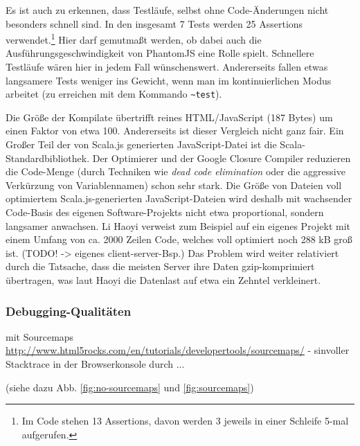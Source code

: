 \documentclass[a4paper, 12pt, hidelinks, listof=totoc, listoftables=totoc, bibliography=totoc]{scrreprt}
\begin{document}
Es ist auch zu erkennen, dass Testläufe, selbst ohne Code-Änderungen nicht besonders schnell sind. In den insgesamt 7 Tests werden 25 Assertions verwendet.\footnote{
	Im Code stehen 13 Assertions, davon werden 3 jeweils in einer Schleife 5-mal aufgerufen.}
Hier darf gemutmaßt werden, ob dabei auch die Ausführungsgeschwindigkeit von PhantomJS eine Rolle spielt. Schnellere Testläufe wären hier in jedem Fall wünschenswert. Andererseits fallen etwas langsamere Tests weniger ins Gewicht, wenn man 
im kontinuierlichen Modus arbeitet (zu erreichen mit dem Kommando \texttt{\textasciitilde{}test}).

Die Größe der Kompilate übertrifft reines HTML/JavaScript (187 Bytes) um einen Faktor von etwa 100. Andererseits ist dieser Vergleich nicht ganz fair. Ein Großer Teil der von Scala.js generierten JavaScript-Datei ist die Scala-Standardbibliothek.
Der Optimierer und der Google Closure Compiler reduzieren die Code-Menge (durch Techniken wie \textit{dead code elimination} oder die aggressive Verkürzung von Variablennamen) schon sehr stark. Die Größe von Dateien voll optimiertem Scala.js-generierten JavaScript-Dateien wird deshalb mit wachsender Code-Basis des eigenen Software-Projekts nicht etwa proportional, sondern langsamer anwachsen. Li Haoyi verweist zum Beispiel auf ein eigenes Projekt mit einem Umfang von ca. 2000 Zeilen Code, welches voll optimiert noch 288 kB groß ist. (TODO! -> eigenes client-server-Bsp.) Das Problem wird weiter relativiert durch die Tatsache, dass die meisten Server ihre Daten gzip-komprimiert übertragen, was laut Haoyi die Datenlast auf etwa ein Zehntel verkleinert.\cite[\#BlobSize]{haoyi.HOS}

\subsubsection{Debugging-Qualitäten}

mit Sourcemaps
\url{http://www.html5rocks.com/en/tutorials/developertools/sourcemaps/}
	- sinvoller Stacktrace in der Browserkonsole durch ...
	
	(siehe dazu Abb. \ref{fig:no-sourcemaps} und \ref{fig:sourcemaps})
\end{document}
